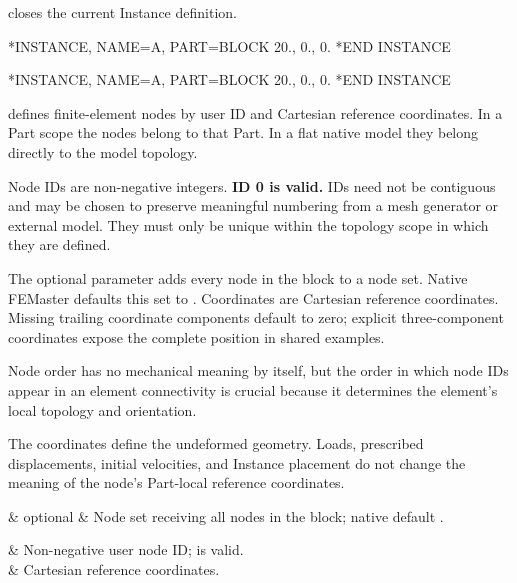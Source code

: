 
 closes the current Instance definition.

\exampleheading

\begin{dialectexamples}
\begin{femasterdeck}
*INSTANCE, NAME=A, PART=BLOCK
20., 0., 0.
*END INSTANCE
\end{femasterdeck}
\begin{abaqusdeck}
*INSTANCE, NAME=A, PART=BLOCK
20., 0., 0.
*END INSTANCE
\end{abaqusdeck}
\end{dialectexamples}


 defines finite-element nodes by user ID and Cartesian reference coordinates. In a Part scope the nodes belong to that Part. In a flat native model they belong directly to the model topology.

Node IDs are non-negative integers. \textbf{ID 0 is valid.} IDs need not be contiguous and may be chosen to preserve meaningful numbering from a mesh generator or external model. They must only be unique within the topology scope in which they are defined.

The optional  parameter adds every node in the block to a node set. Native FEMaster defaults this set to . Coordinates are Cartesian reference coordinates. Missing trailing coordinate components default to zero; explicit three-component coordinates expose the complete position in shared examples.

Node order has no mechanical meaning by itself, but the order in which node IDs appear in an element connectivity is crucial because it determines the element's local topology and orientation.

The coordinates define the undeformed geometry. Loads, prescribed displacements, initial velocities, and Instance placement do not change the meaning of the node's Part-local reference coordinates.

\begin{keywordparameters}
 & optional & Node set receiving all nodes in the block; native default . \\
\end{keywordparameters}

\begin{keyworddata}
 & Non-negative user node ID;  is valid. \\
 & Cartesian reference coordinates. \\
\end{keyworddata}

